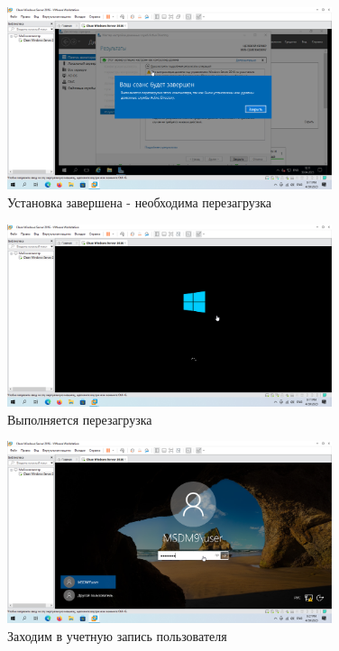 \documentclass[a4paper]{article}
\begin{document}
  \begin{figure}[H]
    \centering
    \includegraphics[width=0.85\textwidth]{Screenshot_60}
    \caption{Установка завершена - необходима перезагрузка}
    \label{img:60}
  \end{figure}

  \begin{figure}[H]
    \centering
    \includegraphics[width=0.85\textwidth]{Screenshot_61}
    \caption{Выполняется перезагрузка}
    \label{img:61}
  \end{figure}

  \begin{figure}[H]
    \centering
    \includegraphics[width=0.85\textwidth]{Screenshot_62}
    \caption{Заходим в учетную запись пользователя}
    \label{img:62}
  \end{figure}
\end{document}
